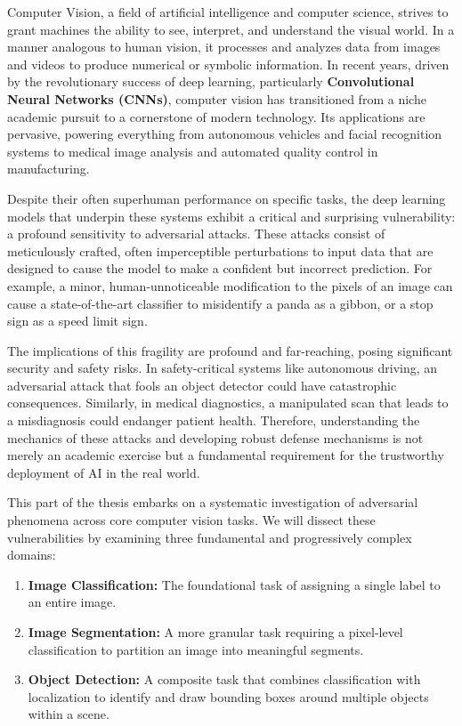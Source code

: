 \documentclass[../main.tex]{subfiles}
\begin{document}
Computer Vision, a field of artificial intelligence and computer science, strives to grant machines the ability to see, interpret, and understand the visual world. In a manner analogous to human vision, it processes and analyzes data from images and videos to produce numerical or symbolic information. In recent years, driven by the revolutionary success of deep learning, particularly \textbf{Convolutional Neural Networks (CNNs)}, computer vision has transitioned from a niche academic pursuit to a cornerstone of modern technology. Its applications are pervasive, powering everything from autonomous vehicles and facial recognition systems to medical image analysis and automated quality control in manufacturing.

Despite their often superhuman performance on specific tasks, the deep learning models that underpin these systems exhibit a critical and surprising vulnerability: a profound sensitivity to adversarial attacks. These attacks consist of meticulously crafted, often imperceptible perturbations to input data that are designed to cause the model to make a confident but incorrect prediction. For example, a minor, human-unnoticeable modification to the pixels of an image can cause a state-of-the-art classifier to misidentify a panda as a gibbon, or a stop sign as a speed limit sign.

The implications of this fragility are profound and far-reaching, posing significant security and safety risks. In safety-critical systems like autonomous driving, an adversarial attack that fools an object detector could have catastrophic consequences. Similarly, in medical diagnostics, a manipulated scan that leads to a misdiagnosis could endanger patient health. Therefore, understanding the mechanics of these attacks and developing robust defense mechanisms is not merely an academic exercise but a fundamental requirement for the trustworthy deployment of AI in the real world.

This part of the thesis embarks on a systematic investigation of adversarial phenomena across core computer vision tasks. We will dissect these vulnerabilities by examining three fundamental and progressively complex domains:

\begin{enumerate}
    \item \textbf{Image Classification:} The foundational task of assigning a single label to an entire image.
    \item \textbf{Image Segmentation:} A more granular task requiring a pixel-level classification to partition an image into meaningful segments.
    \item \textbf{Object Detection:} A composite task that combines classification with localization to identify and draw bounding boxes around multiple objects within a scene.
\end{enumerate}
\end{document}
